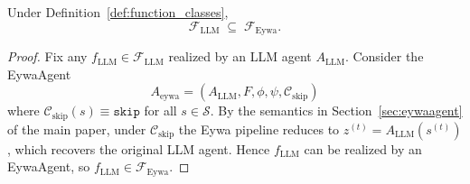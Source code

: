 \begin{proposition}
\label{prop:containment}
Under Definition~\ref{def:function_classes},
\[
\mathcal{F}_{\mathrm{LLM}}\;\subseteq\;\mathcal{F}_{\mathrm{Eywa}}.
\]
\end{proposition}
\begin{proof}
Fix any $f_{\mathrm{LLM}}\in\mathcal{F}_{\mathrm{LLM}}$ realized by an LLM agent $A_{\mathrm{LLM}}$. Consider the EywaAgent 
\begin{equation}
A_{\mathrm{eywa}}=(A_{\mathrm{LLM}},F,\phi,\psi,\mathcal{C}_{\mathrm{skip}})
\end{equation}
where $\mathcal{C}_{\mathrm{skip}}(s)\equiv\texttt{skip}$ for all $s\in\mathcal{S}$. By the semantics in Section~\ref{sec:eywaagent} of the main paper, under $\mathcal{C}_{\mathrm{skip}}$ the Eywa pipeline reduces to $z^{(t)}=A_{\mathrm{LLM}}(s^{(t)})$, which recovers the original LLM agent. Hence $f_{\mathrm{LLM}}$ can be realized by an EywaAgent, so $f_{\mathrm{LLM}}\in\mathcal{F}_{\mathrm{Eywa}}$.
\end{proof}

